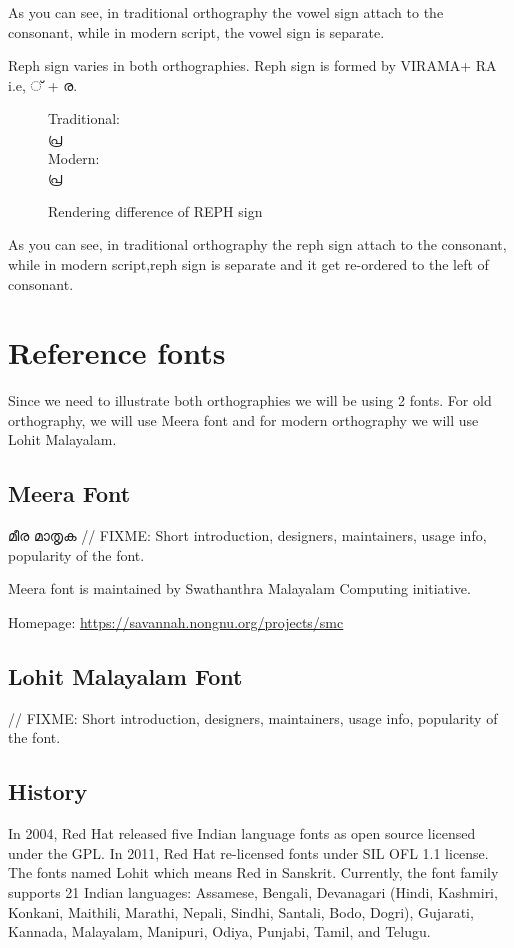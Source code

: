 As you can see, in traditional orthography the vowel sign attach to the
consonant, while in modern script, the vowel sign is separate.

Reph sign varies in both orthographies. Reph sign is formed by VIRAMA+ RA i.e,
{\malayalam ് + ര}.
\begin{figure}[h]
Traditional:\\ {\meera\textexample  പ്ര }\\
Modern: \\ {\lohitmalayalam\textexample  പ്ര }
   \caption{Rendering difference of REPH sign}
\end{figure}

As you can see, in traditional orthography the reph sign attach to the
consonant, while in modern script,reph sign is separate and it get re-ordered
to the left of consonant.


\section{Reference fonts}

Since we need to illustrate both orthographies we will be using 2
fonts. For old orthography, we will use Meera font and for modern
orthography we will use Lohit Malayalam.

\subsection {Meera Font}
{\meera മീര മാതൃക }
// FIXME: Short introduction, designers, maintainers, usage info, popularity of
the font.

Meera font is maintained by Swathanthra Malayalam Computing initiative.

Homepage: {\url{https://savannah.nongnu.org/projects/smc}}

\subsection {Lohit Malayalam Font}
// FIXME: Short introduction, designers, maintainers, usage info, popularity of
the font.

\subsection {History}
In 2004, Red Hat released five Indian language fonts as open source licensed
under the GPL. In 2011, Red Hat re-licensed fonts under SIL OFL 1.1 license.
The fonts named Lohit which means Red in Sanskrit. Currently, the font family
supports 21 Indian languages: Assamese, Bengali, Devanagari (Hindi, Kashmiri,
Konkani, Maithili, Marathi, Nepali, Sindhi, Santali, Bodo, Dogri), Gujarati,
Kannada, Malayalam, Manipuri, Odiya, Punjabi, Tamil, and Telugu.

